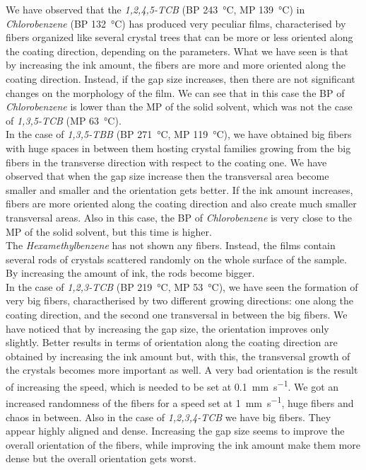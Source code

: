 \documentclass  [
  paper    = a4,
  BCOR     = 10mm,
  twoside,
  fontsize = 12pt,
  fleqn,
  toc      = bibnumbered,
  toc      = listofnumbered,
  numbers  = noendperiod,
  headings = normal,
  listof   = leveldown,
  version  = 3.03
]                                       {scrreprt}
\begin{document}
We have observed that the \emph{1,2,4,5-TCB} (BP \SI{243}{\celsius}, MP \SI{139}{\celsius}) in \emph{Chlorobenzene} (BP \SI{132}{\celsius}) has produced very peculiar films, characterised by fibers organized like several crystal trees that can be more or less oriented along the coating direction, depending on the parameters. What we have seen is that by increasing the ink amount, the fibers are more and more oriented along the coating direction. Instead, if the gap size increases, then there are not significant changes on the morphology of the film. We can see that in this case the BP of \emph{Chlorobenzene} is lower than the MP of the solid solvent, which was not the case of \emph{1,3,5-TCB} (MP \SI{63}{\celsius}).\\
In the case of \emph{1,3,5-TBB} (BP \SI{271}{\celsius}, MP \SI{119}{\celsius}), we have obtained big fibers with huge spaces in between them hosting crystal families growing from the big fibers in the transverse direction with respect to the coating one. We have observed that when the gap size increase then the transversal area become smaller and smaller and the orientation gets better. If the ink amount increases, fibers are more oriented along the coating direction and also create much smaller transversal areas. Also in this case, the BP of \emph{Chlorobenzene} is very close to the MP of the solid solvent, but this time is higher.\\
The \emph{Hexamethylbenzene} has not shown any fibers. Instead, the films contain several rods of crystals scattered randomly on the whole surface of the sample. By increasing the amount of ink, the rods become bigger.\\
In the case of \emph{1,2,3-TCB} (BP \SI{219}{\celsius}, MP \SI{53}{\celsius}), we have seen the formation of  very big fibers, charactherised by two different growing directions: one along the coating direction, and the second one transversal in between the big fibers. We have noticed that by increasing the gap size, the orientation improves only slightly. Better results in terms of orientation along the coating direction are obtained by increasing the ink amount but, with this, the transversal growth of the crystals becomes more important as well. A very bad orientation is the result of increasing the speed, which is needed to be set at \SI[per-mode=symbol]{0.1}{\milli\meter\per\second}. We got an increased randomness of the fibers for a speed set at \SI[per-mode=symbol]{1}{\milli\meter\per\second}, huge fibers and chaos in between.
Also in the case of \emph{1,2,3,4-TCB} we have big fibers. They appear highly aligned and dense. Increasing the gap size seems to improve the overall orientation of the fibers, while improving the ink amount make them more dense but the overall orientation gets worst.\\
\end{document}
